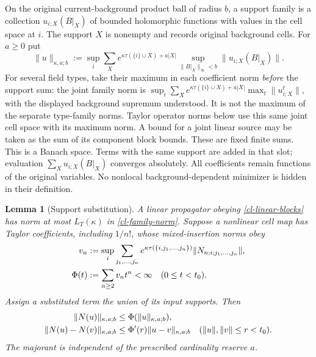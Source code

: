\documentclass[11pt]{article}
\newtheorem{lemma}[theorem]{Lemma}
\theoremstyle{remark}
\begin{document}
On the original current-background product ball of radius $b$, a support
family is a collection $u_{i;X}(B|_X)$ of bounded holomorphic functions
with values in the cell space at $i$. The support $X$ is nonempty and
records original background cells. For $a\ge0$ put
\begin{equation}
 \|u\|_{\kappa,a;b}
 :=\sup_i\sum_X e^{\kappa\tau(\{i\}\cup X)+a|X|}
       \sup_{\|B|_X\|_\infty<b}\|u_{i;X}(B|_X)\|.             \label{cl-family-norm}
\end{equation}
For several field types, take their maximum in each coefficient norm
\emph{before} the support sum: the joint family norm is
$\sup_i\sum_X e^{\kappa\tau(\{i\}\cup X)+a|X|}
\max_t\|u^t_{i;X}\|$, with the displayed background supremum understood.
It is not the maximum of the separate type-family norms. Taylor
operator norms below use this same joint cell space with its maximum
norm. A bound for a joint linear source may be taken as the sum of its
component block bounds. These are fixed finite sums.
This is a Banach space. Terms with the same support are added in that
slot; evaluation $\sum_Xu_{i;X}(B|_X)$ converges absolutely. All
coefficients remain functions of the original variables. No nonlocal
background-dependent minimizer is hidden in their definition.

\begin{lemma}[Support substitution]\label{cl-substitution}
A linear propagator obeying \eqref{cl-linear-blocks} has norm at most
$L_T(\kappa)$ in \eqref{cl-family-norm}. Suppose a nonlinear cell map has
Taylor coefficients, including $1/n!$, whose mixed-insertion norms obey
\begin{align}
 v_n&:=\sup_i\sum_{j_1,\ldots,j_n}
 e^{\kappa\tau(\{i,j_1,\ldots,j_n\})}
       \|N_{n;i;j_1,\ldots,j_n}\|,\notag\\
 \Phi(t)&:=\sum_{n\ge2}v_nt^n<\infty\quad(0\le t<t_0).
                                                               \label{cl-vertex-majorant}
\end{align}
Assign a substituted term the union of its input supports. Then
\begin{align}
 \|N(u)\|_{\kappa,a;b}&\le\Phi(\|u\|_{\kappa,a;b}),\notag\\
 \|N(u)-N(v)\|_{\kappa,a;b}&\le\Phi'(r)\|u-v\|_{\kappa,a;b}
 \quad(\|u\|,\|v\|\le r<t_0).                              \label{cl-substitution-bound}
\end{align}
The majorant is independent of the prescribed cardinality reserve $a$.
\end{lemma}
\end{document}
